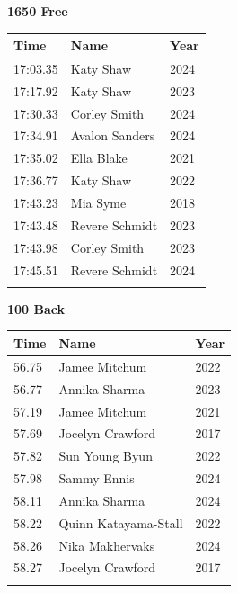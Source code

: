 \vspace{1.2em}
\noindent\begin{minipage}[t]{0.48\textwidth}
\centering
\textbf{\textcolor{teamprimary}{1650 Free}}\par
\vspace{0.5em}
\centering
\small
\renewcommand{\arraystretch}{1.0}
\setlength{\tabcolsep}{4pt}
\begin{tabular}{@{}p{1.8cm}p{3.0cm}p{1.0cm}@{}}
\toprule
\textbf{Time} & \textbf{Name} & \textbf{Year} \\
\midrule
17:03.35 & Katy Shaw & 2024 \\
17:17.92 & Katy Shaw & 2023 \\
17:30.33 & Corley Smith & 2024 \\
17:34.91 & Avalon Sanders & 2024 \\
17:35.02 & Ella Blake & 2021 \\
17:36.77 & Katy Shaw & 2022 \\
17:43.23 & Mia Syme & 2018 \\
17:43.48 & Revere Schmidt & 2023 \\
17:43.98 & Corley Smith & 2023 \\
17:45.51 & Revere Schmidt & 2024 \\
\bottomrule
\vspace{0.5em}
\end{tabular}
\end{minipage}
\hfill
\begin{minipage}[t]{0.48\textwidth}
\centering
\textbf{\textcolor{teamprimary}{100 Back}}\par
\vspace{0.5em}
\centering
\small
\renewcommand{\arraystretch}{1.0}
\setlength{\tabcolsep}{4pt}
\begin{tabular}{@{}p{1.8cm}p{3.0cm}p{1.0cm}@{}}
\toprule
\textbf{Time} & \textbf{Name} & \textbf{Year} \\
\midrule
56.75 & Jamee Mitchum & 2022 \\
56.77 & Annika Sharma & 2023 \\
57.19 & Jamee Mitchum & 2021 \\
57.69 & Jocelyn Crawford & 2017 \\
57.82 & Sun Young Byun & 2022 \\
57.98 & Sammy Ennis & 2024 \\
58.11 & Annika Sharma & 2024 \\
58.22 & Quinn Katayama-Stall & 2022 \\
58.26 & Nika Makhervaks & 2024 \\
58.27 & Jocelyn Crawford & 2017 \\
\bottomrule
\vspace{0.5em}
\end{tabular}
\end{minipage}

